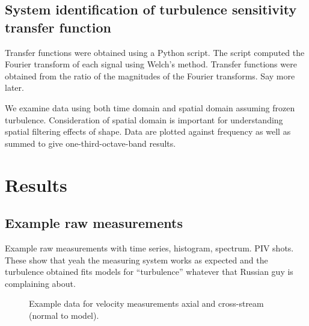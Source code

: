 \subsection{System identification of turbulence sensitivity transfer function}
Transfer functions were obtained using a Python script.  The script computed the Fourier transform of each signal using Welch's method.  Transfer functions were obtained from the ratio of the magnitudes of the Fourier transforms.  Say more later. 

We examine data using both time domain and spatial domain assuming frozen turbulence. Consideration of spatial domain is important for understanding spatial filtering effects of shape.  Data are plotted against frequency as well as summed to give one-third-octave-band results. 

	







\section{Results}

\subsection{Example raw measurements}
Example raw measurements with time series, histogram, spectrum. PIV shots.  These show that yeah the measuring system works as expected and the turbulence obtained fits models for ``turbulence'' whatever that Russian guy is complaining about. 

\begin{figure} 
\caption{Example data for velocity measurements axial and cross-stream (normal to model).}
\end{figure}


